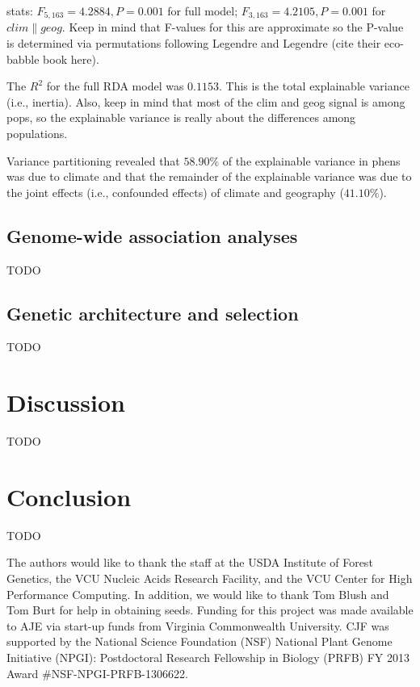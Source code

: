 \documentclass[smallextended]{svjour3}
\begin{document}
stats: $F_{5,163} = 4.2884, P = 0.001$ for full model; $F_{3,163} = 4.2105, P =
0.001$ for $clim\|geog$. Keep in mind that F-values for this are approximate so
the P-value is determined via permutations following Legendre and Legendre (cite
their eco-babble book here).

The $R^{2}$ for the full RDA model was $0.1153$. This is the total explainable
variance (i.e., inertia). Also, keep in mind that most of the clim and geog
signal is among pops, so the explainable variance is really about the
differences among populations.

Variance partitioning revealed that $58.90\%$ of the explainable variance in
phens was due to climate and that the remainder of the explainable variance was
due to the joint effects (i.e., confounded effects) of climate and geography
($41.10\%$).

\subsection*{Genome-wide association analyses}
TODO

\subsection*{Genetic architecture and selection}
TODO

\section*{Discussion}
TODO


\section*{Conclusion}
TODO


\begin{acknowledgements}
  The authors would like to thank the staff at the USDA Institute of Forest
  Genetics, the VCU Nucleic Acids Research Facility, and the VCU Center for High
  Performance Computing.  In addition, we would like to thank Tom Blush and Tom
  Burt for help in obtaining seeds. Funding for this project was made available
  to AJE via start-up funds from Virginia Commonwealth University. CJF was
  supported by the National Science Foundation (NSF) National Plant Genome
  Initiative (NPGI): Postdoctoral Research Fellowship in Biology (PRFB) FY 2013
  Award \#NSF-NPGI-PRFB-1306622.
\end{acknowledgements}
\end{document}
